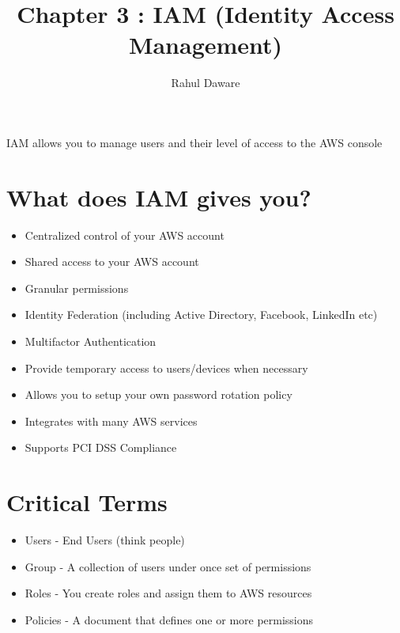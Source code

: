 \documentclass{report}
\author{Rahul Daware}
\begin{document}
\title{Chapter 3 : IAM (Identity Access Management)}
\maketitle

IAM allows you to manage users and their level of access to the AWS console 

\section*{What does IAM gives you?}
\begin{itemize}
\item
Centralized control of your AWS account

\item
Shared access to your AWS account

\item
Granular permissions

\item
Identity Federation (including Active Directory, Facebook, LinkedIn etc)

\item
Multifactor Authentication

\item
Provide temporary access to users/devices when necessary

\item
Allows you to setup your own password rotation policy

\item
Integrates with many AWS services

\item
Supports PCI DSS Compliance
\end{itemize}

\section*{Critical Terms}
\begin{itemize}
\item
Users - End Users (think people)

\item
Group - A collection of users under once set of permissions

\item
Roles - You create roles and assign them to AWS resources

\item
Policies - A document that defines one or more permissions

\end{itemize}
\end{document}
